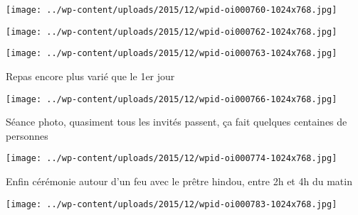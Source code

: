 \begin{center} \texttt{[image: ../wp-content/uploads/2015/12/wpid-oi000760-1024x768.jpg]} \end{center}

 

 

\begin{center} \texttt{[image: ../wp-content/uploads/2015/12/wpid-oi000762-1024x768.jpg]} \end{center}

 

 

\begin{center} \texttt{[image: ../wp-content/uploads/2015/12/wpid-oi000763-1024x768.jpg]} \end{center}

 

 Repas encore plus varié que le 1er jour 

 

\begin{center} \texttt{[image: ../wp-content/uploads/2015/12/wpid-oi000766-1024x768.jpg]} \end{center}

 

 Séance photo, quasiment tous les invités passent, ça fait quelques centaines de personnes 

 

\begin{center} \texttt{[image: ../wp-content/uploads/2015/12/wpid-oi000774-1024x768.jpg]} \end{center}

 

 Enfin cérémonie autour d'un feu avec le prêtre hindou, entre 2h et 4h du matin 

 

\begin{center} \texttt{[image: ../wp-content/uploads/2015/12/wpid-oi000783-1024x768.jpg]} \end{center}




 
 
